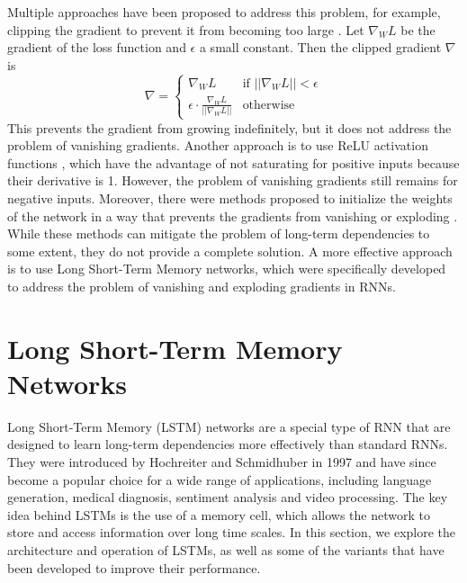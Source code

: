 \documentclass{article}
\begin{document}
Multiple approaches have been proposed to address this problem, for example, clipping the
gradient to prevent it from becoming too large
\cite{pascanuDifficultyTrainingRecurrent2013}. Let $\nabla_W L$ be the gradient of the
loss function and $\epsilon$ a small constant. Then the clipped gradient $\nabla$ is
\begin{equation}
  \nabla =
  \begin{cases}
    \nabla_W L                                       & \text{if } ||\nabla_W L|| < \epsilon \\
    \epsilon \cdot \frac{\nabla_W L}{||\nabla_W L||} & \text{otherwise}
  \end{cases}
\end{equation}
This prevents the gradient from growing indefinitely, but it does not address the problem
of vanishing gradients. Another approach is to use ReLU activation functions
\cite{glorotDeepSparseRectifier2010}, which have the advantage of not saturating for
positive inputs because their derivative is 1. However, the problem of vanishing gradients
still remains for negative inputs. Moreover, there were methods proposed to initialize the
weights of the network in a way that prevents the gradients from vanishing or exploding
\cite{kumar2017weight}. While these methods can mitigate the problem of long-term
dependencies to some extent, they do not provide a complete solution. A more effective
approach is to use Long Short-Term Memory networks, which were specifically
developed to address the problem of vanishing and exploding gradients in RNNs.



\section{Long Short-Term Memory Networks}
\label{ch:3}

Long Short-Term Memory (LSTM) networks are a special type of RNN that are designed to
learn long-term dependencies more effectively than standard RNNs. They were introduced by
Hochreiter and Schmidhuber in 1997 \cite{hochreiterLongShorttermMemory1997} and have since
become a popular choice for a wide range of applications, including language generation,
medical diagnosis, sentiment analysis and video processing. The key idea behind LSTMs is
the use of a memory cell, which allows the network to store and access information over
long time scales. In this section, we explore the architecture and operation of LSTMs, as
well as some of the variants that have been developed to improve their performance.
\end{document}
